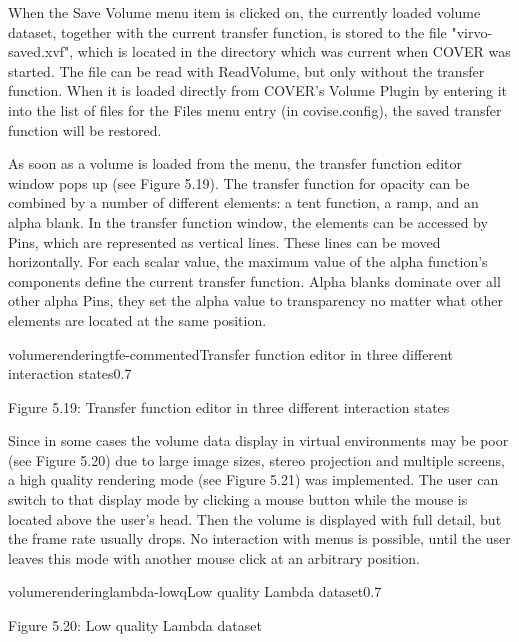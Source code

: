 When the Save Volume menu item is clicked on, the currently loaded volume dataset, together with the 
current transfer function, is stored to the file "virvo-saved.xvf", which is located in the directory which
was current when COVER was started. The file can be read with ReadVolume, but only without the transfer function.
When it is loaded directly from COVER's Volume Plugin by entering it into the list of files for the Files menu entry 
(in covise.config), the saved transfer function will be restored.

As soon as a volume is loaded from the menu, the transfer function editor window pops up (see Figure 5.19). 
The transfer function 
for opacity can be combined by a number of different elements: a tent function, a ramp, and an alpha blank. 
In the transfer function window, the elements can be accessed by Pins, which are represented as vertical lines. 
These lines can be moved horizontally. For each scalar value, the maximum value of the alpha function's 
components define the current transfer function. Alpha blanks dominate over all other alpha Pins, they set the 
alpha value to transparency no matter what other elements are located at the same position. 

\begin{covimg}{volumerendering}{tfe-commented}{Transfer function editor in three different interaction states}{0.7}\end{covimg}
\begin{htmlonly}
Figure 5.19: Transfer function editor in three different interaction states
\vspace{0.5cm}
\end{htmlonly}

Since in some cases the volume data display in virtual environments may be poor (see Figure 5.20) due 
to large image sizes, 
stereo projection and multiple screens, a high quality rendering mode (see  Figure 5.21) was implemented. 
The user can switch 
to that display mode by clicking a mouse button while the mouse is located above the user's head. Then the volume 
is displayed with full detail, but the frame rate usually drops. No interaction with menus is
possible, until the user leaves this mode with another mouse click at an arbitrary position.

\begin{covimg}{volumerendering}{lambda-lowq}{Low quality Lambda dataset}{0.7}\end{covimg}
\begin{htmlonly}
Figure 5.20: Low quality Lambda dataset
\vspace{0.5cm}
\end{htmlonly}


